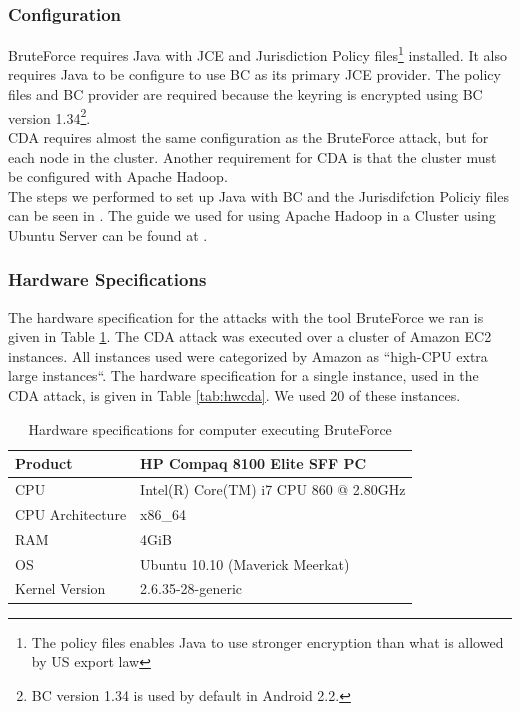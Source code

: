 \documentclass[pdftex,english,10pt,b5paper,twoside]{book}
\begin{document}
\subsubsection{Configuration} BruteForce requires Java with \ac{JCE} and
Jurisdiction Policy files\footnote{The policy files enables Java to use
stronger encryption than what is allowed by US export law} installed.  It also
requires Java to be configure to use \ac{BC} as its primary \ac{JCE} provider.
The policy files and \ac{BC} provider are required because the keyring is
encrypted using BC version 1.34\footnote{BC version 1.34 is used by default in
Android 2.2.}.\\

\noindent \ac{CDA} requires almost the same configuration as the BruteForce
attack, but for each node in the cluster. Another requirement for
\ac{CDA} is that the cluster must be configured with Apache Hadoop.\\

\noindent The steps we performed to set up Java with \ac{BC} and the
Jurisdifction Policiy files can be seen in \cite{jce+bc}. The guide we used for
using Apache Hadoop in a Cluster using Ubuntu Server can be found at
\cite{cluster}.

\subsubsection{Hardware Specifications} The hardware specification for the
attacks with the tool BruteForce we ran is given in Table \ref{tab:hwbf}. The
\ac{CDA} attack was executed over a cluster of Amazon \ac{EC2} instances. All
instances used were categorized by Amazon as ``high-CPU extra large
instances``. The hardware specification for a single instance, used in the
\ac{CDA} attack, is given in Table \ref{tab:hwcda}. We used 20 of these
instances.

\begin{table}[!h]
    \centering
    \caption{Hardware specifications for computer executing BruteForce}
    \label{tab:hwbf}
    \begin{tabular}{| l | l |}
	\hline
	Product		        &HP Compaq 8100 Elite SFF PC \\
	\hline
	CPU		            &Intel(R) Core(TM) i7 CPU 860 @ 2.80GHz\\
	\hline
	CPU Architecture    &x86\_64\\
	\hline
	RAM		            &4GiB\\
	\hline
	OS		            &Ubuntu 10.10 (Maverick Meerkat)\\
	\hline
	Kernel Version	    &2.6.35-28-generic\\
	\hline
    \end{tabular}
\end{table}
\end{document}
